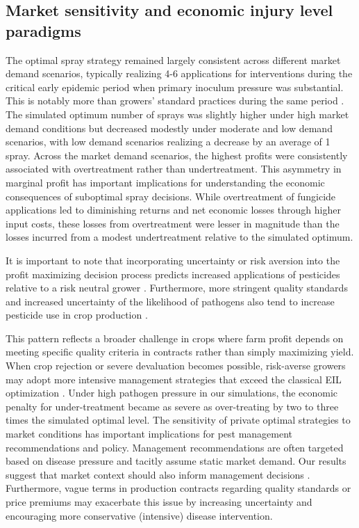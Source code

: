 \documentclass[10pt,a4paper]{article}
\begin{document}
\subsection{Market sensitivity and economic injury level paradigms}

The optimal spray strategy remained largely consistent across different market demand scenarios, typically realizing 4-6 applications for interventions during the critical early epidemic period when primary inoculum pressure was substantial. \added{}This is notably more than growers' standard practices during the same period \parencite{hwang_diversity_2025}. The simulated optimum number of sprays was slightly higher under high market demand conditions but decreased modestly under moderate and low demand scenarios, with low demand scenarios realizing a decrease by an average of 1 spray. Across the market demand scenarios, the highest profits were consistently associated with overtreatment rather than undertreatment. This asymmetry in marginal profit has important implications for understanding the economic consequences of suboptimal spray decisions. While overtreatment of fungicide applications led to diminishing returns and net economic losses through higher input costs, these losses from overtreatment were lesser in magnitude than the losses incurred from a modest undertreatment relative to the simulated optimum.

It is important to note that incorporating uncertainty or risk aversion into the profit maximizing decision process predicts increased applications of pesticides relative to a risk neutral grower \parencite{Feder1979}. Furthermore, more stringent quality standards and increased uncertainty of the likelihood of pathogens also tend to increase pesticide use in crop production \parencite{Marsh2000}.

This pattern reflects a broader challenge in crops where farm profit depends on meeting specific quality criteria in contracts rather than simply maximizing yield. When crop rejection or severe devaluation becomes possible, risk-averse growers may adopt more intensive management strategies that exceed the classical EIL optimization \parencite{Feder1979}. Under high pathogen pressure in our simulations, the economic penalty for under-treatment became as severe as over-treating by two to three times the simulated optimal level. The sensitivity of private optimal strategies to market conditions has important implications for pest management recommendations and policy. Management recommendations are often targeted based on disease pressure and tacitly assume static market demand. Our results suggest that market context should also inform management decisions \parencite{Marsh2000}. Furthermore, vague terms in production contracts regarding quality standards or price premiums may exacerbate this issue by increasing uncertainty and encouraging more conservative (intensive) disease intervention.
\end{document}
